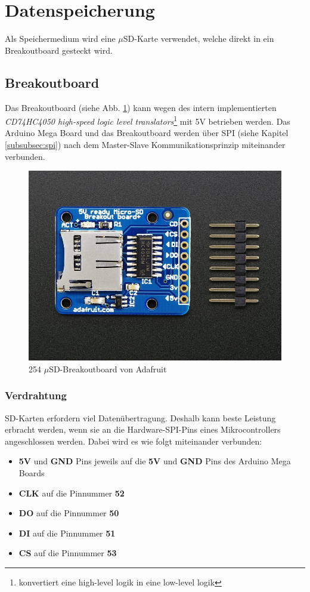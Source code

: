 \section{Datenspeicherung}
Als Speichermedium wird eine $\mu$SD-Karte verwendet, welche direkt in ein Breakoutboard gesteckt wird.\\
\subsection{Breakoutboard}
Das Breakoutboard (siehe Abb. \ref{fig:muSDBreakout}) kann wegen des intern implementierten \textit{CD74HC4050 high-speed logic level translators}\footnote{konvertiert eine high-level logik in eine low-level logik} mit 5V betrieben werden. Das Arduino Mega Board und das Breakoutboard werden über SPI (siehe Kapitel \ref{subsubsec:spi}) nach dem Master-Slave Kommunikationsprinzip miteinander verbunden. 
\begin{figure}[h]
\centering
\includegraphics[width=0.5\linewidth]{graphics/Datenspeicherung/micro_sd_card_breakout.png}
\caption{254 $\mu$SD-Breakoutboard von Adafruit \cite{ladyada2018}}
\label{fig:muSDBreakout}
\end{figure}

\subsubsection{Verdrahtung}
SD-Karten erfordern viel Datenübertragung. Deshalb kann beste Leistung erbracht werden, wenn sie an die Hardware-SPI-Pins eines Mikrocontrollers angeschlossen werden. Dabei wird es wie folgt miteinander verbunden: \cite{ladyada2018}
\begin{itemize}
\item \textbf{5V} und \textbf{GND} Pins jeweils auf die \textbf{5V} und \textbf{GND} Pins des Arduino Mega Boards
\item \textbf{CLK} auf die Pinnummer \textbf{52}
\item \textbf{DO} auf die Pinnummer \textbf{50}
\item \textbf{DI} auf die Pinnummer \textbf{51}
\item \textbf{CS} auf die Pinnummer \textbf{53}
\end{itemize}

